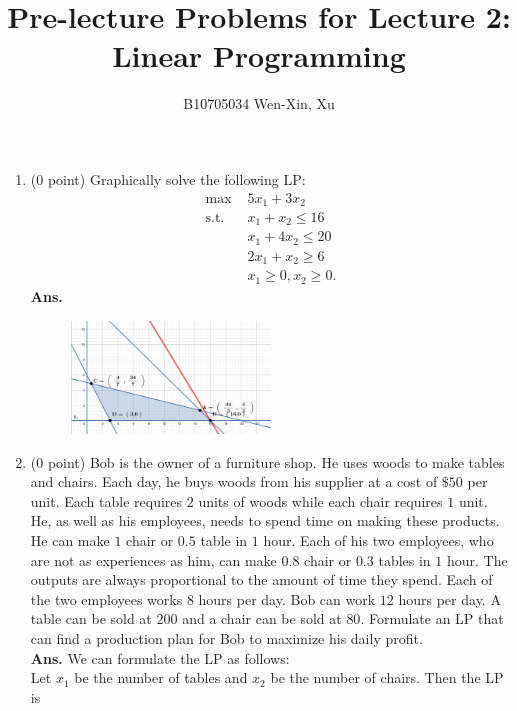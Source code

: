 \documentclass[12pt]{article}
\title{Pre-lecture Problems for Lecture 2:\\ Linear Programming}
\author{B10705034 Wen-Xin, Xu}
\begin{document}
\maketitle
\begin{enumerate}
    \item ($0$ point) Graphically solve the following LP:
          \begin{align*}
              \text{max }  & 5x_1+3x_2              \\
              \text{s.t. } & x_1+x_2 \leq 16        \\
                           & x_1+4x_2 \leq 20       \\
                           & 2x_1+x_2 \geq 6        \\
                           & x_1 \geq0, x_2 \geq 0.
          \end{align*}
          \textbf{Ans.}
          \begin{figure}[H]
              \centering
              \includegraphics[width=0.5\textwidth]{p1.png}
          \end{figure}
    \item ($0$ point) Bob is the owner of a furniture shop. He uses woods to make tables and chairs. Each day, he buys woods from his supplier at a cost of $\$50$ per unit. Each table requires $2$ units of woods while each chair requires $1$ unit. He, as well as his employees, needs to spend time on making these products. He can make $1$ chair or $0.5$ table in $1$ hour. Each of his two employees, who are not as experiences as him, can make $0.8$ chair or $0.3$ tables in $1$ hour. The outputs are always proportional to the amount of time they spend. Each of the two employees works $8$ hours per day. Bob can work $12$ hours per day. A table can be sold at $200$ and a chair can be sold at $80$. Formulate an LP that can find a production plan for Bob to maximize his daily profit.\\
          \textbf{Ans.}
          We can formulate the LP as follows:\\
          Let $x_1$ be the number of tables and $x_2$ be the number of chairs. Then the LP is

\end{enumerate}
\end{document}
